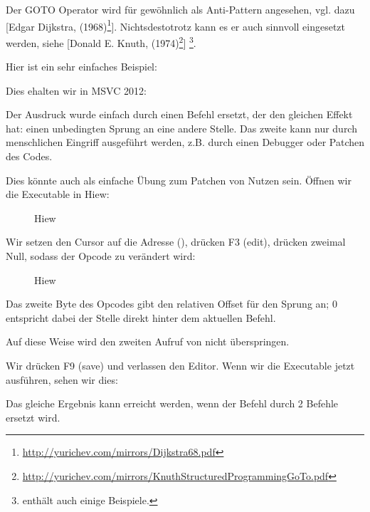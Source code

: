 
Der GOTO Operator wird für gewöhnlich als Anti-Pattern angesehen, vgl. dazu
[Edgar Dijkstra,  (1968)\footnote{\url{http://yurichev.com/mirrors/Dijkstra68.pdf}}].
Nichtsdestotrotz kann es er auch sinnvoll eingesetzt werden, siehe
[Donald E. Knuth,  (1974)\footnote{\url{http://yurichev.com/mirrors/KnuthStructuredProgrammingGoTo.pdf}}]
\footnote{\InSqBrackets{\CNotes} enthält auch einige Beispiele.}.

Hier ist ein sehr einfaches Beispiel:



Dies ehalten wir in MSVC 2012:


Der  Ausdruck wurde einfach durch einen \JMP Befehl ersetzt, der den gleichen Effekt hat: einen unbedingten Sprung an eine andere Stelle.
Das zweite \printf kann nur durch menschlichen Eingriff ausgeführt werden, z.B. durch einen Debugger oder Patchen des Codes.

\par

\clearpage
Dies könnte auch als einfache Übung zum Patchen von Nutzen sein. Öffnen wir die Executable in Hiew:

\begin{figure}[H]
\centering
{}
\caption{Hiew}
\label{fig:goto_hiew1}
\end{figure}

\clearpage
Wir setzen den Cursor auf die Adresse \JMP (), drücken F3 (edit), drücken zweimal Null, sodass der Opcode
zu  verändert wird:

\begin{figure}[H]
\centering
{}
\caption{Hiew}
\label{fig:goto_hiew2}
\end{figure}
Das zweite Byte des \JMP Opcodes gibt den relativen Offset für den Sprung an; 0 entspricht dabei der Stelle direkt
hinter dem aktuellen Befehl.

Auf diese Weise wird \JMP den zweiten Aufruf von \printf nicht überspringen.

Wir drücken F9 (save) und verlassen den Editor. Wenn wir die Executable jetzt ausführen, sehen wir dies:


Das gleiche Ergebnis kann erreicht werden, wenn der \JMP Befehl durch 2 \NOP Befehle ersetzt wird.


